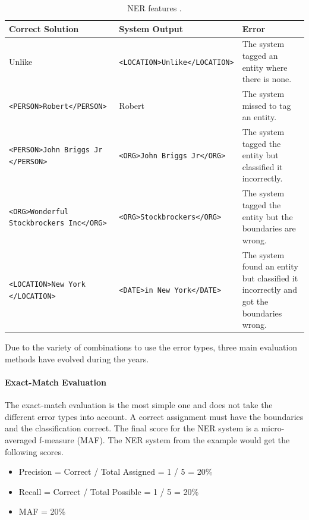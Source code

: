 \documentclass[a4paper,twoside]{book}      %
\begin{document}
\begin{table}[ht!]
\centering
\begin{tabularx}{\linewidth}{|X|X|X|}
\hline
Correct Solution	 		& 	System Output	& Error\\
\hline
\hline
Unlike						&	\verb$<LOCATION>Unlike</LOCATION>$	&	The system tagged an entity where there is none.\\
\hline
\verb$<PERSON>Robert</PERSON>$	&	Robert								& 	The system missed to tag an entity.\\
\hline
\verb$<PERSON>John Briggs Jr$ \verb$</PERSON>$	& \verb$<ORG>John Briggs Jr</ORG>$	&	The system tagged the entity but classified it incorrectly.\\
\hline
\verb$<ORG>Wonderful$ \verb$Stockbrockers Inc</ORG>$	&	\verb$<ORG>Stockbrockers</ORG>$	&	The system tagged the entity but the boundaries are wrong.\\
\hline
\verb$<LOCATION>New York$ \verb$</LOCATION>$	&	\verb$<DATE>in New York</DATE>$	&	The system found an entity but classified it incorrectly and got the boundaries wrong.\\
\hline
\end{tabularx} 
\caption{NER features \cite{nadeau2007yooname}.}
\label{tab:nererrors}
\end{table}

Due to the variety of combinations to use the error types, three main evaluation methods have evolved during the years.

\paragraph{Exact-Match Evaluation}
The exact-match evaluation is the most simple one and does not take the different error types into account. A correct assignment must have the boundaries and the classification correct. The final score for the NER system is a micro-averaged f-measure (MAF). The NER system from the example would get the following scores.
\begin{itemize}
\item Precision = Correct / Total Assigned = 1 / 5 = 20\%
\item Recall = Correct / Total Possible = 1 / 5 = 20\%
\item MAF = 20\%
\end{itemize}
\end{document}
